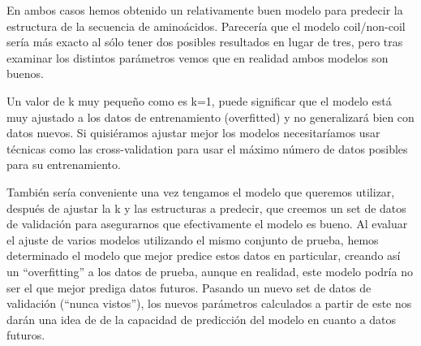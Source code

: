 \documentclass[
]{article}
\begin{document}
En ambos casos hemos obtenido un relativamente buen modelo para predecir
la estructura de la secuencia de aminoácidos. Parecería que el modelo
coil/non-coil sería más exacto al sólo tener dos posibles resultados en
lugar de tres, pero tras examinar los distintos parámetros vemos que en
realidad ambos modelos son buenos.

Un valor de k muy pequeño como es k=1, puede significar que el modelo
está muy ajustado a los datos de entrenamiento (overfitted) y no
generalizará bien con datos nuevos. Si quisiéramos ajustar mejor los
modelos necesitaríamos usar técnicas como las cross-validation para usar
el máximo número de datos posibles para su entrenamiento.

También sería conveniente una vez tengamos el modelo que queremos
utilizar, después de ajustar la k y las estructuras a predecir, que
creemos un set de datos de validación para asegurarnos que efectivamente
el modelo es bueno. Al evaluar el ajuste de varios modelos utilizando el
mismo conjunto de prueba, hemos determinado el modelo que mejor predice
estos datos en particular, creando así un ``overfitting'' a los datos de
prueba, aunque en realidad, este modelo podría no ser el que mejor
prediga datos futuros. Pasando un nuevo set de datos de validación
(``nunca vistos''), los nuevos parámetros calculados a partir de este
nos darán una idea de de la capacidad de predicción del modelo en cuanto
a datos futuros.
\end{document}

